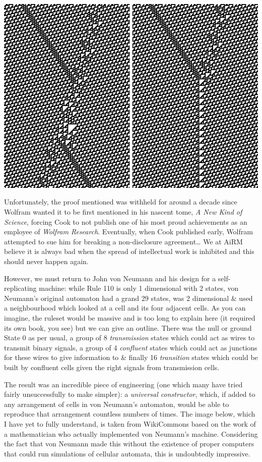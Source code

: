 \documentclass[10pt,a4paper]{article}
\newcounter{count}
\begin{document}
\begin{multicols}{2}
\includegraphics[width=\linewidth]{image_2.png}

Unfortunately, the proof mentioned was withheld for around a decade
since Wolfram wanted it to be first mentioned in his nascent tome,
\emph{A New Kind of Science}, forcing Cook to not publish one of his
most proud achievements as an employee of \emph{Wolfram Research}.
Eventually, when Cook published early, Wolfram attempted to sue him for
breaking a non-disclosure agreement\ldots{} We at AiRM believe it is
always bad when the spread of intellectual work is inhibited and this
should never happen again.

However, we must return to John von Neumann and his design for a
self-replicating machine: while Rule 110 is only 1 dimensional with 2
states, von Neumann's original automaton had a grand 29 states, was 2
dimensional \& used a neighbourhood which looked at a cell and its four
adjacent cells. As you can imagine, the ruleset would be massive and is
too long to explain here (it required its own book, you see) but we can
give an outline. There was the null or ground State 0 as per usual, a
group of 8 \emph{transmission} states which could act as wires to
transmit binary signals, a group of 4 \emph{confluent} states which
could act as junctions for these wires to give information to \& finally
16 \emph{transition} states which could be built by confluent cells
given the right signals from transmission cells.

The result was an incredible piece of engineering (one which many have
tried fairly unsuccessfully to make simpler): a \emph{universal
	constructor}, which, if added to any arrangement of cells in von
Neumann's automaton, would be able to reproduce that arrangement
countless numbers of times. The image below, which I have yet to fully
understand, is taken from WikiCommons based on the work of a
mathematician who actually implemented von Neumann's machine.
Considering the fact that von Neumann made this without the existence of
proper computers that could run simulations of cellular automata, this
is undoubtedly impressive.


\end{multicols}
\end{document}
